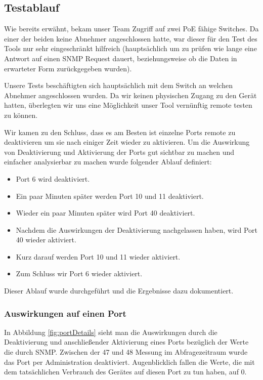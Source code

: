 \subsection{Testablauf}
Wie bereits erwähnt, bekam unser Team Zugriff auf zwei PoE fähige Switches. Da einer der beiden keine Abnehmer angeschlossen hatte, war dieser für den Test des Tools nur sehr eingeschränkt hilfreich (hauptsächlich um zu prüfen wie lange eine Antwort auf einen SNMP Request dauert, beziehungsweise ob die Daten in erwarteter Form zurückgegeben wurden).

Unsere Tests beschäftigten sich hauptsächlich mit dem Switch an welchen Abnehmer angeschlossen wurden. Da wir keinen physischen Zugang zu den Gerät hatten, überlegten wir uns eine Möglichkeit unser Tool vernünftig remote testen zu können.

Wir kamen zu den Schluss, dass es am Besten ist einzelne Ports remote zu deaktivieren um sie nach einiger Zeit wieder zu aktivieren. Um die Auswirkung von Deaktivierung und Aktivierung der Ports gut sichtbar zu machen und einfacher analysierbar zu machen wurde folgender Ablauf definiert:

\begin{itemize}
 \item Port 6 wird deaktiviert.
 \item Ein paar Minuten später werden Port 10 und 11 deaktiviert.
 \item Wieder ein paar Minuten später wird Port 40 deaktiviert.
 \item Nachdem die Auswirkungen der Deaktivierung nachgelassen haben, wird Port 40 wieder aktiviert.
 \item Kurz darauf werden Port 10 und 11 wieder aktiviert.
 \item Zum Schluss wir Port 6 wieder aktiviert.
\end{itemize}

Dieser Ablauf wurde durchgeführt und die Ergebnisse dazu dokumentiert.

\subsubsection{Auswirkungen auf einen Port}
In Abbildung \ref{fig:portDetails} sieht man die Auswirkungen durch die Deaktivierung und anschließender Aktivierung eines Ports bezüglich der Werte die durch SNMP. Zwischen der 47 und 48 Messung im Abfragezeitraum wurde das Port per Administration deaktiviert. Augenblicklich fallen die Werte, die mit dem tatsächlichen Verbrauch des Gerätes auf diesen Port zu tun haben, auf 0. 

